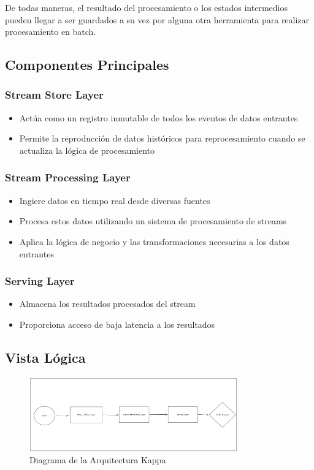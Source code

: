 De todas maneras, el resultado del procesamiento o los estados intermedios pueden llegar a ser guardados a su vez por alguna otra herramienta
para realizar procesamiento en batch. 

\newpage
\subsection{Componentes Principales}

\subsubsection{Stream Store Layer}
\begin{itemize}
    \item Actúa como un registro inmutable de todos los eventos de datos entrantes
    \item Permite la reproducción de datos históricos para reprocesamiento cuando se actualiza la lógica de procesamiento
\end{itemize}

\subsubsection{Stream Processing Layer}
\begin{itemize}
    \item Ingiere datos en tiempo real desde diversas fuentes
    \item Procesa estos datos utilizando un sistema de procesamiento de streams
    \item Aplica la lógica de negocio y las transformaciones necesarias a los datos entrantes
\end{itemize}

\subsubsection{Serving Layer}
\begin{itemize}
    \item Almacena los resultados procesados del stream
    \item Proporciona acceso de baja latencia a los resultados
\end{itemize}

\newpage
\subsection{Vista Lógica}
\begin{figure}[h]
\centering
\includegraphics[width=0.8\textwidth]{teorico/arquitecturas/kappa.png}
\caption{Diagrama de la Arquitectura Kappa}
\label{fig:arquitectura_kappa}
\end{figure}

